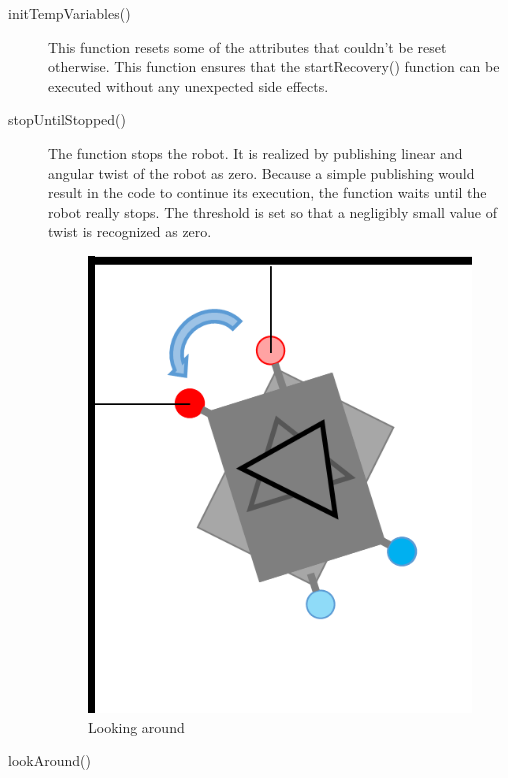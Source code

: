 \begin{description}
\item[initTempVariables()] 

This function resets some of the attributes that couldn't be reset otherwise. This function ensures that the startRecovery() function can be executed without any unexpected side effects.

\item[stopUntilStopped()] 

The function stops the robot. It is realized by publishing linear and angular twist of the robot as zero. Because a simple publishing would result in the code to continue its execution, the function waits until the robot really stops. The threshold is set so that a negligibly small value of twist is recognized as zero.

\begin{figure}[htb]
\centering
\includegraphics[scale=0.5]{graphics/find_best_angle.png}
\caption{Looking around}
\label{best}
\centering
\end{figure}

\item[lookAround()] 


\end{description}

